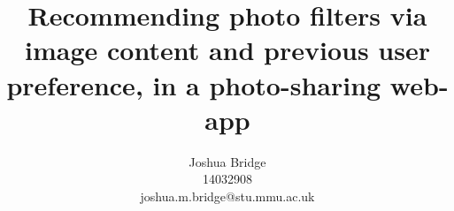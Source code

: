 \documentclass[a4paper,12pt]{report}
\title{Recommending photo filters via image content and previous user preference, in a photo-sharing web-app}
\author{Joshua Bridge \\14032908 \\joshua.m.bridge@stu.mmu.ac.uk}
\begin{document}
\maketitle

\doublespacing

\tableofcontents

\end{document}
